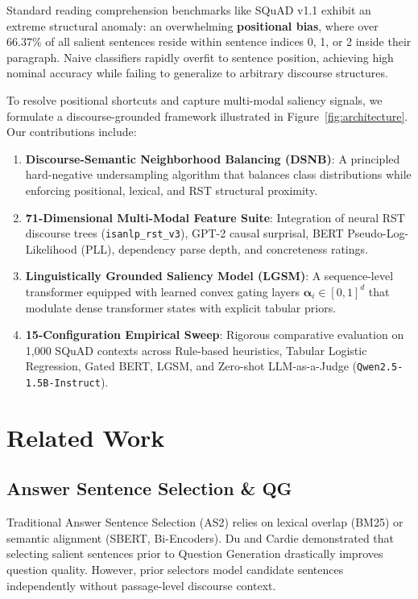 \documentclass[11pt,a4paper,twocolumn]{article}
\begin{document}
Standard reading comprehension benchmarks like SQuAD v1.1 \cite{rajpurkar2016squad} exhibit an extreme structural anomaly: an overwhelming \textbf{positional bias}, where over $66.37\%$ of all salient sentences reside within sentence indices 0, 1, or 2 inside their paragraph. Naive classifiers rapidly overfit to sentence position, achieving high nominal accuracy while failing to generalize to arbitrary discourse structures.

To resolve positional shortcuts and capture multi-modal saliency signals, we formulate a discourse-grounded framework illustrated in Figure~\ref{fig:architecture}. Our contributions include:
\begin{enumerate}
    \item \textbf{Discourse-Semantic Neighborhood Balancing (DSNB)}: A principled hard-negative undersampling algorithm that balances class distributions while enforcing positional, lexical, and RST structural proximity.
    \item \textbf{71-Dimensional Multi-Modal Feature Suite}: Integration of neural RST discourse trees (\texttt{isanlp\_rst\_v3}), GPT-2 causal surprisal, BERT Pseudo-Log-Likelihood (PLL), dependency parse depth, and concreteness ratings.
    \item \textbf{Linguistically Grounded Saliency Model (LGSM)}: A sequence-level transformer equipped with learned convex gating layers $\boldsymbol{\alpha}_i \in [0, 1]^d$ that modulate dense transformer states with explicit tabular priors.
    \item \textbf{15-Configuration Empirical Sweep}: Rigorous comparative evaluation on 1,000 SQuAD contexts across Rule-based heuristics, Tabular Logistic Regression, Gated BERT, LGSM, and Zero-shot LLM-as-a-Judge (\texttt{Qwen2.5-1.5B-Instruct}).
\end{enumerate}

\section{Related Work}
\subsection{Answer Sentence Selection \& QG}
Traditional Answer Sentence Selection (AS2) relies on lexical overlap (BM25) or semantic alignment (SBERT, Bi-Encoders). Du and Cardie \cite{du2017learning} demonstrated that selecting salient sentences prior to Question Generation drastically improves question quality. However, prior selectors model candidate sentences independently without passage-level discourse context.
\end{document}
